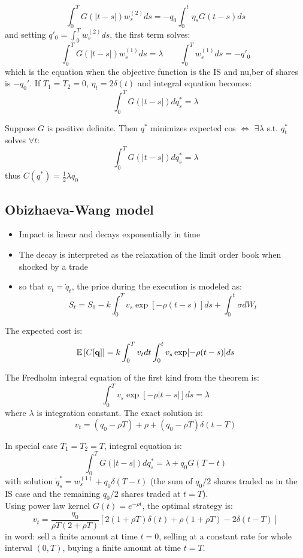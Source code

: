 \[
\int_0^T G(|t-s|)w_s^{(2)}ds = -q_0\int_0^t \eta_s G(t-s)ds
\]
and setting $q'_0 = \int_0^T w_s^{(2)}ds$, the first term solves:
\[
\int_0^T G(|t-s|)w_s^{(1)}ds = \lambda \qquad \int_0^T w_s^{(1)}ds = -q'_0
\]
which is the equation when the objective function is the IS and nu,ber of shares is $-q_0'$.
If $T_1 = T_2 = 0$, $\eta_t = 2\delta(t)$ and integral equation becomes:
\[
\int_0^T G(|t-s|)dq^*_s = \lambda
\]
\newpage
\begin{mytheorem}
	Suppose $G$ is positive definite. Then $q^*$ minimizes expected cos $\iff$ $\exists\lambda$ s.t. $q_t^*$ solves $\forall t$:
	\[
	\int_0^T G(|t-s|)dq^*_s = \lambda
	\]
thus $C(q^*) = \frac{1}{2} \lambda q_0$
\end{mytheorem}
\subsection{Obizhaeva-Wang model}
\begin{mysetting}
	\begin{itemize}
		\item Impact is linear and decays exponentially in time
		\item The decay is interpreted as the relaxation of the limit order book when shocked by a trade
		\item so that $v_t = \dot{q}_t$, the price during the execution is modeled as:
		\[
		S_t = S_0 - k \int_0^T v_s \exp[-\rho(t-s)]ds + \int_0^t \sigma dW_t
		\]
	\end{itemize}
\end{mysetting}
The expected cost is:
\[
\mathbb{E}\left[C[\mathbf{q}]\right] = k \int_0^T v_tdt \int_0^t v_s \exp[-\rho(t-s)]ds
\]
\begin{mytheorem}
	The Fredholm integral equation of the first kind from the theorem is:
	\[
	\int_0^T v_s\exp[-\rho |t-s|]ds =\lambda
	\]
where $\lambda$ is integration constant. The exact solution is:
\[
v_t = (q_0 -\rho T) + \rho + (q_0 - \rho T)\delta(t-T)
\]
\end{mytheorem}
In special case $T_1 = T_2 = T$, integral equation is:
\[
\int_0^T G(|t-s|) dq_s^* = \lambda + q_0G(T-t)
\]
with solution $\dot{q}_s^* = w_s^{(1)} + q_0 \delta(T-t)$ (the sum of $q_0/2$ shares traded as in the IS case and the remaining $q_0/2$ shares traded at $t=T$).\\
Using power law kernel $G(t) = e^{-\rho t}$, the optimal strategy is:
\[
v_t = \frac{q_0}{\rho T (2+ \rho T)} [ 2(1 + \rho T)\delta(t) + \rho(1+ \rho T) - 2\delta (t-T)]
\]
in word: sell a finite amount at time $t=0$, selling at a constant rate for whole interval $(0,T)$, buying a finite amount at time $t=T$.
